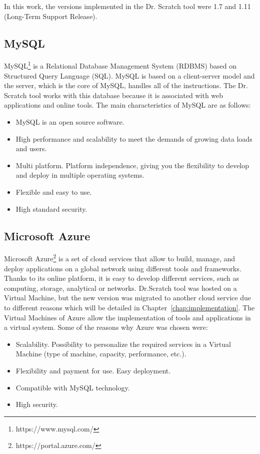 In this work, the versions implemented in the Dr. Scratch tool were 1.7 and 1.11 (Long-Term Support Release).


\subsection{MySQL}
\label{subsec:mysql}

MySQL\footnote{https://www.mysql.com/} is a Relational Database Management System (RDBMS) based on Structured Query Language (SQL). MySQL is based on a client-server model and the server, which is the core of MySQL, handles all of the instructions. The Dr. Scratch tool works with this database because it is associated with web applications and online tools. The main characteristics of MySQL are as follows:


\begin{itemize}
  \item MySQL is an open source software.
  \item High performance and scalability to meet the demands of growing data loads and users.
  \item Multi platform. Platform independence, giving you the flexibility to develop and deploy in multiple operating systems.
  \item Flexible and easy to use.
  \item High standard security.
\end{itemize}  

 

\subsection{Microsoft Azure}
\label{subsec:azure}

Microsoft Azure\footnote{https://portal.azure.com/} is a set of cloud services that allow to build, manage, and deploy applications on a global network using different tools and frameworks. Thanks to its online platform, it is easy to develop different services, such as computing, storage, analytical or networks. Dr.Scratch tool was hosted on a Virtual Machine, but the new version was migrated to another cloud service due to different reasons which will be detailed in Chapter~\ref{chap:implementation}. The Virtual Machines of Azure allow the implementation of tools and applications in a virtual system. Some of the reasons why Azure was chosen were:

\begin{itemize}
    \item Scalability. Possibility to personalize the required services in a Virtual Machine (type of machine, capacity, performance, etc.).
    \item Flexibility and payment for use. Easy deployment.
    \item Compatible with MySQL technology.
    \item High security.
\end{itemize}


